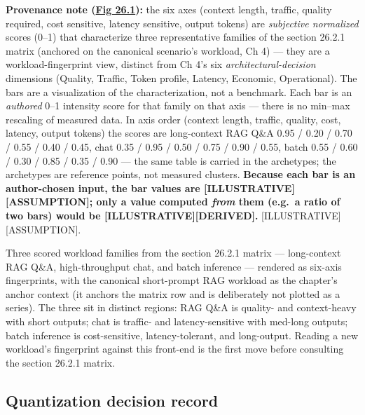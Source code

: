 \textbf{Provenance note (\hyperref[fig:26.1]{Fig 26.1}):} the six axes (context length,
traffic, quality required, cost sensitive, latency sensitive, output
tokens) are \emph{subjective normalized} scores (0--1) that characterize
three representative families of the section 26.2.1 matrix (anchored on
the canonical scenario's workload, Ch 4) --- they are a
workload-fingerprint view, distinct from Ch 4's six
\emph{architectural-decision} dimensions (Quality, Traffic, Token
profile, Latency, Economic, Operational). The bars are a visualization
of the characterization, not a benchmark. Each bar is an \emph{authored}
0--1 intensity score for that family on that axis --- there is no
min--max rescaling of measured data. In axis order (context length,
traffic, quality, cost, latency, output tokens) the scores are
long-context RAG Q\&A 0.95 / 0.20 / 0.70 / 0.55 / 0.40 / 0.45, chat 0.35
/ 0.95 / 0.50 / 0.75 / 0.90 / 0.55, batch 0.55 / 0.60 / 0.30 / 0.85 /
0.35 / 0.90 --- the same table is carried in the archetypes; the
archetypes are reference points, not measured clusters. \textbf{Because
each bar is an author-chosen input, the bar values are
\mbox{{[}ILLUSTRATIVE{]}}\hspace{0pt}\mbox{{[}ASSUMPTION{]}}; only a value computed \emph{from}
them (e.g.~a ratio of two bars) would be
\mbox{{[}ILLUSTRATIVE{]}}\hspace{0pt}\mbox{{[}DERIVED{]}}.} \mbox{{[}ILLUSTRATIVE{]}}\hspace{0pt}\mbox{{[}ASSUMPTION{]}}.

Three scored workload families from the section 26.2.1 matrix ---
long-context RAG Q\&A, high-throughput chat, and batch inference ---
rendered as six-axis fingerprints, with the canonical short-prompt RAG
workload as the chapter's anchor context (it anchors the matrix row and
is deliberately not plotted as a series). The three sit in distinct
regions: RAG Q\&A is quality- and context-heavy with short outputs; chat
is traffic- and latency-sensitive with med-long outputs; batch inference
is cost-sensitive, latency-tolerant, and long-output. Reading a new
workload's fingerprint against this front-end is the first move before
consulting the section 26.2.1 matrix.

\subsection{Quantization decision
record}\label{quantization-decision-record}

